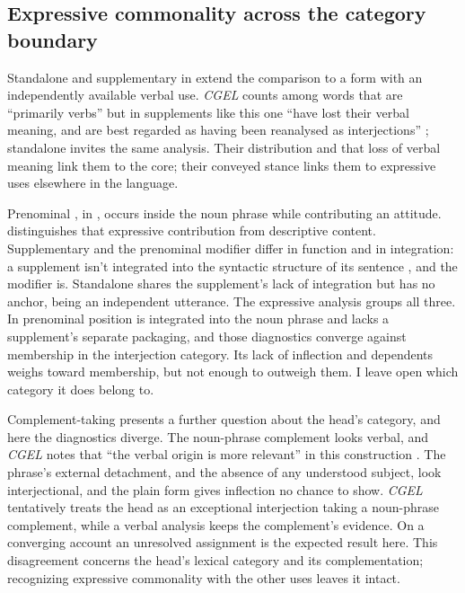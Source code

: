 \documentclass[12pt]{article}
\begin{document}
\subsection{Expressive commonality across the category boundary}\label{sec:damn-profiles}

Standalone  and supplementary  in
 extend the comparison to a form
with an independently available verbal use. \textit{CGEL} counts
 among words that are \enquote{primarily verbs} but in
supplements like this one \enquote{have lost their verbal meaning, and are
best regarded as having been reanalysed as interjections}
\citep[1361]{HuddlestonPullum2002}; standalone  invites the
same analysis. Their distribution and that loss of verbal meaning link them
to the core; their conveyed stance links them to
expressive uses elsewhere in the language.

Prenominal , in , occurs inside the
noun phrase while contributing an attitude. \textcite[166, 181]{potts2007}
distinguishes that expressive contribution from descriptive content.
Supplementary  and the prenominal modifier differ in function
and in integration: a supplement isn't integrated into the syntactic
structure of its sentence \citep[1350]{HuddlestonPullum2002}, and the
modifier is. Standalone  shares the supplement's lack of
integration but has no anchor, being an independent utterance. The
expressive analysis groups all three. In prenominal position 
is integrated into the noun phrase and lacks a supplement's separate
packaging, and those diagnostics converge against membership in the
interjection category. Its lack of inflection and dependents weighs
toward membership, but not enough to outweigh them. I leave
open which category it does belong to.

Complement-taking  presents a further
question about the head's category, and here the diagnostics diverge. The
noun-phrase complement looks verbal, and \textit{CGEL} notes that
\enquote{the verbal origin is more relevant} in this construction
\citep[1361 n.~70]{HuddlestonPullum2002}. The
phrase's external detachment, and the absence of any understood subject,
look interjectional, and the plain form gives inflection no chance to show.
\textit{CGEL} tentatively treats the head as an exceptional interjection
taking a noun-phrase complement, while a verbal analysis keeps the complement's evidence. On a converging
account an unresolved assignment is the expected result here. This disagreement concerns the head's lexical
category and its complementation; recognizing expressive commonality with
the other  uses leaves it intact.
\end{document}
